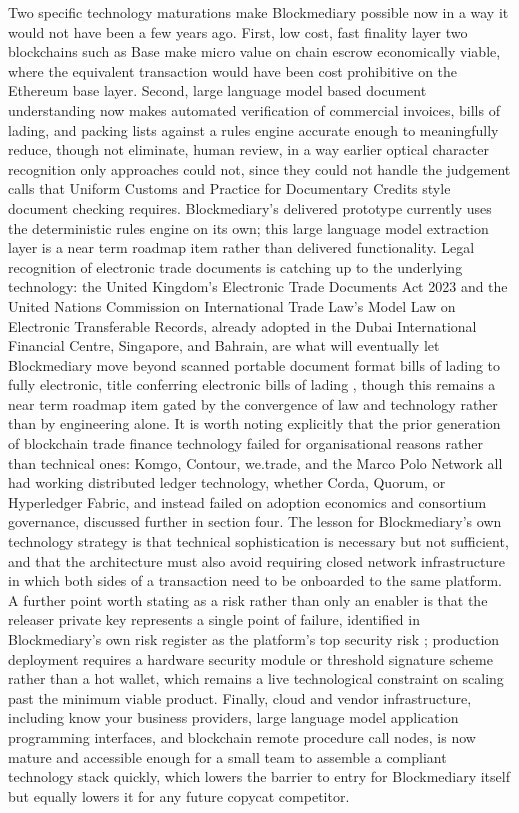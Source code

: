 \documentclass[12pt, a4paper]{article}
\begin{document}
Two specific technology maturations make Blockmediary possible now in a way it would not
have been a few years ago. First, low cost, fast finality layer two blockchains such as
Base make micro value on chain escrow economically viable, where the equivalent
transaction would have been cost prohibitive on the Ethereum base layer. Second, large
language model based document understanding now makes automated verification of
commercial invoices, bills of lading, and packing lists against a rules engine accurate
enough to meaningfully reduce, though not eliminate, human review, in a way earlier
optical character recognition only approaches could not, since they could not handle the
judgement calls that Uniform Customs and Practice for Documentary Credits style document
checking requires. Blockmediary's delivered prototype currently uses the deterministic
rules engine on its own; this large language model extraction layer is a near term
roadmap item rather than delivered functionality. Legal recognition of electronic trade documents is catching up to the
underlying technology: the United Kingdom's Electronic Trade Documents Act 2023 and the
United Nations Commission on International Trade Law's Model Law on Electronic
Transferable Records, already adopted in the Dubai International Financial Centre,
Singapore, and Bahrain, are what will eventually let Blockmediary move beyond scanned
portable document format bills of lading to fully electronic, title conferring electronic
bills of lading \citep{etda2023, uncitralmletr}, though this remains a near term roadmap
item gated by the convergence of law and technology rather than by engineering alone. It
is worth noting explicitly that the prior generation of blockchain trade finance
technology failed for organisational reasons rather than technical ones: Komgo, Contour,
we.trade, and the Marco Polo Network all had working distributed ledger technology,
whether Corda, Quorum, or Hyperledger Fabric, and instead failed on adoption economics and
consortium governance, discussed further in section four. The lesson for Blockmediary's
own technology strategy is that technical sophistication is necessary but not sufficient,
and that the architecture must also avoid requiring closed network infrastructure in which
both sides of a transaction need to be onboarded to the same platform. A further point
worth stating as a risk rather than only an enabler is that the releaser private key
represents a single point of failure, identified in Blockmediary's own risk register as
the platform's top security risk \citep{internallegalrisk2026}; production deployment
requires a hardware security module or threshold signature scheme rather than a hot
wallet, which remains a live technological constraint on scaling past the minimum viable
product. Finally, cloud and vendor infrastructure, including know your business providers,
large language model application programming interfaces, and blockchain remote procedure
call nodes, is now mature and accessible enough for a small team to assemble a compliant
technology stack quickly, which lowers the barrier to entry for Blockmediary itself but
equally lowers it for any future copycat competitor.
\end{document}

